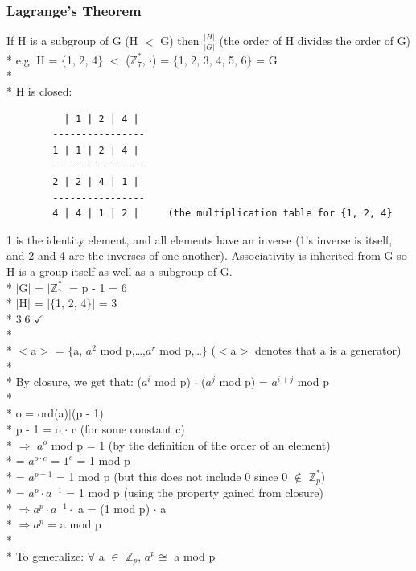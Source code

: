 \documentclass[11pt]{article}
\begin{document}
\subsubsection{Lagrange's Theorem}
If H is a subgroup of G (H $<$ G) then
$\frac{\lvert H\rvert}{\lvert G\rvert}$ (the order of H divides the order of
G)\\*
e.g. H = $\{$1, 2, 4$\}$ $<$ ($\mathbb{Z}^*_7$, $\cdot$) = $\{$1, 2, 3, 4, 5, 6$\}$
= G\\*\\*
H is closed:
\begin{verbatim}
		  | 1 | 2 | 4 |
		----------------
		1 | 1 | 2 | 4 |
		----------------
		2 | 2 | 4 | 1 |
		----------------
		4 | 4 | 1 | 2 |		(the multiplication table for {1, 2, 4}
\end{verbatim}
1 is the identity element, and all elements have an inverse (1's inverse is
itself, and 2 and 4 are the inverses of one another).  Associativity is
inherited from G so H is a group itself as well as a subgroup of G.\\*
$\lvert$G$\rvert$ = $\lvert$$\mathbb{Z}^*_7$$\rvert$ = p - 1 = 6\\*
$\lvert$H$\rvert$ = $\lvert$$\{$1, 2, 4$\}$$\rvert$ = 3\\*
3$\mid$6 $\checkmark$\\*\\*
$<$a$>$ = $\{$a, $a^2$ mod p,\ldots,$a^r$ mod p,\ldots$\}$ ($<$a$>$ denotes
that a is a generator)\\*\\*
By closure, we get that: ($a^i$ mod p) $\cdot$ ($a^j$ mod p) = $a^{i+j}$ mod p\\*\\*
o = ord(a)$\mid$(p - 1)\\* p - 1 = o $\cdot$ c (for some constant c)\\*
$\Rightarrow$ $a^o$ mod p = 1 (by the definition of the order of an element)\\*
= $a^{o \cdot c}$ = $1^c$ = 1 mod p\\*
= $a^{p-1}$ = 1 mod p (but this does not include 0 since 0 $\notin$
$\mathbb{Z}^*_p$)\\*
= $a^p \cdot a^{-1}$ = 1 mod p (using the property gained from closure)\\*
$\Longrightarrow a^p \cdot a^{-1} \cdot$ a = (1 mod p) $\cdot$ a\\*
$\Longrightarrow a^p$ = a mod p\\*\\*
To generalize: $\forall$ a $\in$ $\mathbb{Z}_p$, \makebox[0.25in]{}$a^p \cong$
a mod p
\end{document}
